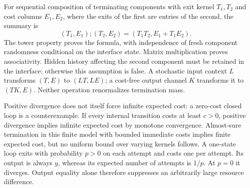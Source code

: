 \documentclass[11pt]{article}
\begin{document}
For sequential composition of terminating components with exit kernel $T_1,T_2$ and cost columns $E_1,E_2$, where the exits of the first are entries of the second, the summary is
\[(T_1,E_1);(T_2,E_2)=(T_1T_2,E_1+T_1E_2).
\]
The tower property proves the formula, with independence of fresh component randomness conditional on the interface state. Matrix multiplication proves associativity. Hidden history affecting the second component must be retained in the interface; otherwise this assumption is false. A stochastic input context $L$ transforms $(T,E)$ to $(LT,LE)$; a cost-free output channel $K$ transforms it to $(TK,E)$. Neither operation renormalizes termination mass.

Positive divergence does not itself force infinite expected cost: a zero-cost closed loop is a counterexample. If every internal transition costs at least $c>0$, positive divergence implies infinite expected cost by monotone convergence. Almost-sure termination in this finite model with bounded immediate costs implies finite expected cost, but no uniform bound over varying kernels follows. A one-state loop exits with probability $p>0$ on each attempt and costs one per attempt. Its output is always $y$, whereas its expected number of attempts is $1/p$. At $p=0$ it diverges. Output equality alone therefore suppresses an arbitrarily large resource difference.
\end{document}
